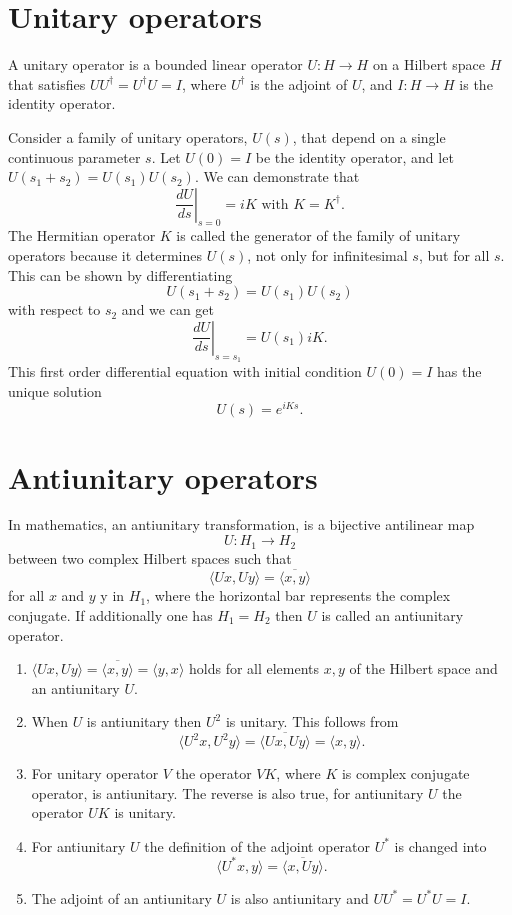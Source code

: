 \section{Unitary operators}
\begin{newdef}
 A unitary operator is a bounded linear operator $U: H\to H$ on a Hilbert space $H$ that satisfies $UU^{\dagger} = U^{\dagger}U =I$, where $U^{\dagger}$ is the adjoint of $U$, and $I: H \to H$ is the identity operator.
\end{newdef}
\noindent
Consider a family of unitary operators, $U(s)$, that depend on a single continuous parameter $s$. 
Let $U(0) = I $ be the identity operator, and let $U(s_1+s_2) = U(s_1)U(s_2)$.
We can demonstrate that
\[\left. \frac{dU}{ds}\right|_{s=0} = iK \mbox{ with } K = K^{\dagger}.\]
The Hermitian operator $K$ is called the generator of the family of unitary operators because it determines $U(s)$, not only for infinitesimal $s$, but for all $s$. This can be shown by differentiating
\[U(s_1+s_2) = U(s_1)U(s_2) \]
with respect to $s_2$ and we can get
\[\left. \frac{dU}{ds}\right|_{s=s_1} = U(s_1)iK .\]
This first order differential equation with initial condition $U(0) = I$ has the unique solution
\[U(s) = e^{iKs}.\]

\section{Antiunitary operators}
\begin{newdef}
In mathematics, an antiunitary transformation, is a bijective antilinear map
\[U:H_{1}\to H_{2} \]
between two complex Hilbert spaces such that
\[\langle Ux,Uy\rangle ={\overline {\langle x,y\rangle }} \]
for all $x$ and $y$ y in $H_{1}$, where the horizontal bar represents the complex conjugate. If additionally one has $H_{1}=H_{2}$ then $U$ is called an antiunitary operator.
\end{newdef}

\begin{newprop}
\begin{enumerate}
\item $\langle Ux,Uy\rangle =\overline {\langle x,y\rangle }=\langle y,x\rangle$ holds for all elements $x, y$ of the Hilbert space and an antiunitary $U$.
\item When $U$ is antiunitary then $U^{2}$ is unitary. This follows from
\[ \langle U^{2}x,U^{2}y\rangle =\overline {\langle Ux,Uy\rangle }=\langle x,y\rangle.\]
\item For unitary operator $V$ the operator $VK$, where $K$ is complex conjugate operator, is antiunitary. The reverse is also true, for antiunitary $U$ the operator $UK$ is unitary.
\item For antiunitary $U$ the definition of the adjoint operator $U^{*}$ is changed into
\[\langle U^{*}x,y\rangle =\overline {\langle x,Uy\rangle }.\]
\item The adjoint of an antiunitary $U$ is also antiunitary and $UU^{*}=U^{*}U=I$.
\end{enumerate}
\end{newprop}

